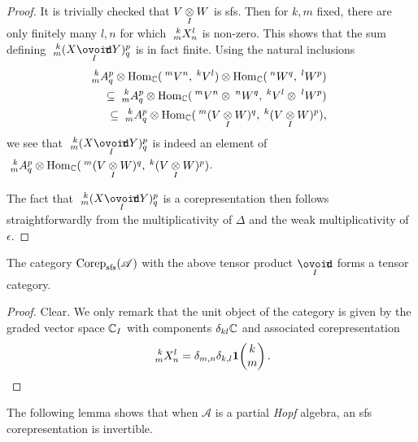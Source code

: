 \begin{proof} It is trivially checked that $V\iitimes W$ is sfs. Then for $k,m$ fixed, there are only finitely many $l,n$ for which $\Gr{X}{k}{l}{m}{n}$ is non-zero. This shows that the sum defining $\Gr{(X\Circt Y)}{k}{p}{m}{q}$ is in fact finite. Using the natural inclusions \begin{eqnarray*} &&\hspace{-2cm} \Gr{A}{k}{p}{m}{q}\otimes \Hom_\C(\Gru{V}{m}{n},\Gru{V}{k}{l})\otimes  \Hom_\C(\Gru{W}{n}{q},\Gru{W}{l}{p}) \\ && \subseteq \Gr{A}{k}{p}{m}{q} \otimes \Hom_\C(\Gru{V}{m}{n}\otimes \Gru{W}{n}{q},\Gru{V}{k}{l}\otimes \Gru{W}{l}{p})\\ &&\subseteq \Gr{A}{k}{p}{m}{q}\otimes \Hom_\C(\Gru{(V\iitimes W)}{m}{q},\Gru{(V\iitimes W)}{k}{p}),\end{eqnarray*} we see that $\Gr{(X\Circt Y)}{k}{p}{m}{q}$ is indeed an element of $\Gr{A}{k}{p}{m}{q}\otimes \Hom_\C(\Gru{(V\iitimes W)}{m}{q},\Gru{(V\iitimes W)}{k}{p})$. 

The fact that $\Gr{(X\Circt Y)}{k}{p}{m}{q}$ is a corepresentation then follows straightforwardly from the multiplicativity of $\Delta$ and the weak multiplicativity of $\epsilon$.
\end{proof} 

\begin{Cor} The category $\Corep_{\sfs}(\mathscr{A})$ with the above tensor product $\Circt$ forms a tensor category.
\end{Cor}
\begin{proof} Clear. We only remark that the unit object of the category is given by the graded vector space $\C_I$ with components $\delta_{kl}\C$ and associated corepresentation \[\Gr{X}{k}{l}{m}{n} = \delta_{m,n}\delta_{k,l} \UnitC{k}{m}.\] 
\end{proof} 


The following lemma shows that when $\mathscr{A}$ is a partial \emph{Hopf} algebra, an sfs corepresentation is invertible.

